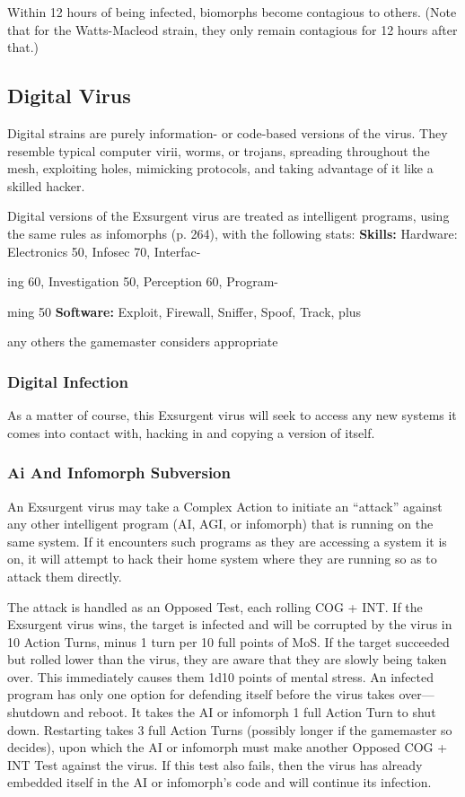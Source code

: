 Within 12 hours of being infected, biomorphs 
become contagious to others. (Note that for the 
Watts-Macleod strain, they only remain contagious 
for 12 hours after that.)

\subsection{Digital Virus}

Digital strains are purely information- or code-based 
versions of the virus. They resemble typical computer 
virii, worms, or trojans, spreading throughout the 
mesh, exploiting holes, mimicking protocols, and 
taking advantage of it like a skilled hacker.

Digital versions of the Exsurgent virus are treated 
as intelligent programs, using the same rules as infomorphs
(p. 264), with the following stats:
\textbf{Skills:} Hardware: Electronics 50, Infosec 70, Interfac-

ing 60, Investigation 50, Perception 60, Program-

ming 50
\textbf{Software:} Exploit, Firewall, Sniffer, Spoof, Track, plus 

any others the gamemaster considers appropriate

\subsubsection{Digital Infection}

As a matter of course, this Exsurgent virus will seek 
to access any new systems it comes into contact with, 
hacking in and copying a version of itself.

\subsubsection{Ai And Infomorph Subversion}

An Exsurgent virus may take a Complex Action to initiate
an ``attack'' against any other intelligent program
(AI, AGI, or infomorph) that is running on the same 
system. If it encounters such programs as they are accessing
a system it is on, it will attempt to hack their
home system where they are running so as to attack 
them directly. 

The attack is handled as an Opposed Test, each rolling
COG + INT. If the Exsurgent virus wins, the target
is infected and will be corrupted by the virus in 10 
Action Turns, minus 1 turn per 10 full points of MoS. 
If the target succeeded but rolled lower than the virus, 
they are aware that they are slowly being taken over. 
This immediately causes them 1d10 points of mental 
stress. An infected program has only one option for 
defending itself before the virus takes over—shutdown 
and reboot. It takes the AI or infomorph 1 full Action 
Turn to shut down. Restarting takes 3 full Action Turns 
(possibly longer if the gamemaster so decides), upon 
which the AI or infomorph must make another Opposed
COG + INT Test against the virus. If this test also
fails, then the virus has already embedded itself in the 
AI or infomorph's code and will continue its infection.

